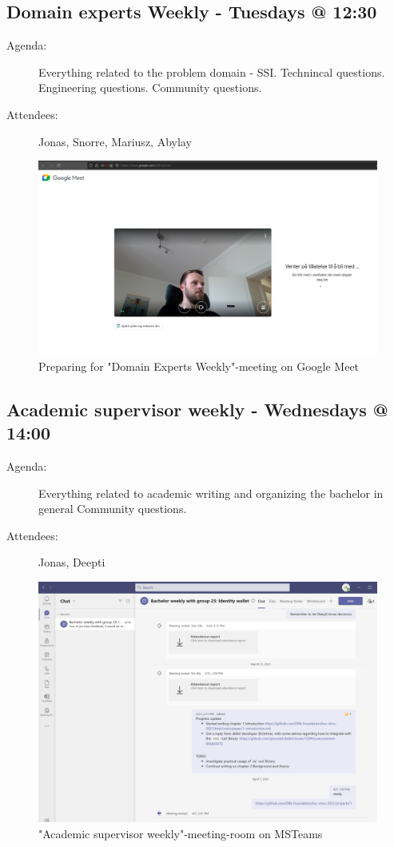 \subsection{Domain experts Weekly - Tuesdays @ 12:30}

    \begin{description}
        \item[Agenda:] Everything related to the problem domain - SSI. Technincal questions. Engineering questions. Community questions.
        \item[Attendees:] Jonas, Snorre, Mariusz, Abylay
    \end{description}

    \begin{figure}[htbp]
      \centering
      \includegraphics[width=.7\textwidth]{figures/googlemeet.png}
      \caption[Meeting domain experts]{Preparing for "Domain Experts Weekly"-meeting on Google Meet}
    \end{figure}
    
\subsection{Academic supervisor weekly - Wednesdays @ 14:00}
    
    \begin{description}
        \item[Agenda:] Everything related to academic writing and organizing the bachelor in general Community questions.
        \item[Attendees:] Jonas, Deepti
    \end{description}

    \begin{figure}[htbp]
      \centering
      \includegraphics[width=.7\textwidth]{figures/msteams-weekly.png}
      \caption[Meeting academic supervisor]{"Academic supervisor weekly"-meeting-room on MSTeams}
    \end{figure}
    

